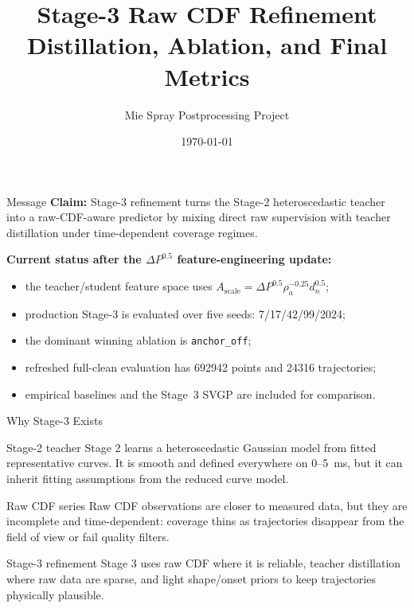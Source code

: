 \documentclass[UTF8,aspectratio=169]{ctexbeamer}
\title[Stage-3 Raw CDF Refinement]{Stage-3 Raw CDF Refinement\\Distillation, Ablation, and Final Metrics}
\author{Mie Spray Postprocessing Project}
\date{\today}
\begin{document}
\begin{frame}
  \titlepage
\end{frame}

\begin{frame}{Message}
\small
\textbf{Claim:} Stage-3 refinement turns the Stage-2 heteroscedastic teacher into a raw-CDF-aware predictor by mixing direct raw supervision with teacher distillation under time-dependent coverage regimes.

\vspace{0.45em}
\textbf{Current status after the \(\Delta P^{0.5}\) feature-engineering update:}
\begin{itemize}
  \item the teacher/student feature space uses \(A_{\mathrm{scale}}=\Delta P^{0.5}\rho_a^{-0.25}d_n^{0.5}\);
  \item production Stage-3 is evaluated over five seeds: 7/17/42/99/2024;
  \item the dominant winning ablation is \texttt{anchor\_off};
  \item refreshed full-clean evaluation has \num{692942} points and \num{24316} trajectories;
  \item empirical baselines and the Stage~3 SVGP are included for comparison.
\end{itemize}
\end{frame}

\begin{frame}{Why Stage-3 Exists}
\small
\begin{block}{Stage-2 teacher}
Stage 2 learns a heteroscedastic Gaussian model from fitted representative curves. It is smooth and defined everywhere on \(0\)--\SI{5}{ms}, but it can inherit fitting assumptions from the reduced curve model.
\end{block}

\begin{block}{Raw CDF series}
Raw CDF observations are closer to measured data, but they are incomplete and time-dependent: coverage thins as trajectories disappear from the field of view or fail quality filters.
\end{block}

\begin{block}{Stage-3 refinement}
Stage 3 uses raw CDF where it is reliable, teacher distillation where raw data are sparse, and light shape/onset priors to keep trajectories physically plausible.
\end{block}
\end{frame}
\end{document}
